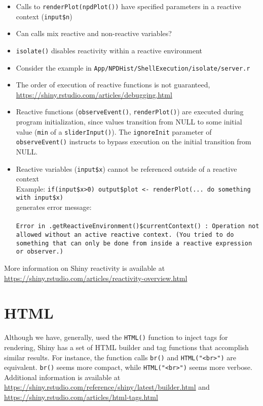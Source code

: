 \documentclass[10pt, letterpaper]{article}
\begin{document}
\begin{spacing}{1.0}
\begin{itemize}
    \item Calls to \texttt{renderPlot(npdPlot())} have specified parameters in a reactive context (\texttt{input\$n})
    \item Can calls mix reactive and non-reactive variables?
    \item \texttt{isolate()} disables reactivity within a reactive environment
    \item Consider the example in \texttt{App/NPDHist/ShellExecution/isolate/server.r}
    \item The order of execution of reactive functions is not guaranteed, \url{https://shiny.rstudio.com/articles/debugging.html}
    \item Reactive functions (\texttt{observeEvent()}, \texttt{renderPlot()}) are executed during program initialization, since values transition from NULL to some initial value (\texttt{min} of a \texttt{sliderInput()}).  The \texttt{ignoreInit} parameter of \texttt{observeEvent()} instructs to bypass execution on the initial transition from NULL.
    \item Reactive variables (\texttt{input\$x}) cannot be referenced outside of a reactive context\\
    Example: \texttt{if(input\$x>0) {output\$plot <- renderPlot(... do something with input\$x)}}\\
    generates error message:\\\\
    \texttt{Error in .getReactiveEnvironment()\$currentContext() : 
    Operation not allowed without an active reactive context. (You tried to do something that can only be done from inside a reactive expression or observer.)}
\end{itemize}

More information on Shiny reactivity is available at \url{https://shiny.rstudio.com/articles/reactivity-overview.html}


\section{HTML}\label{sec:HTML}

Although we have, generally, used the \texttt{HTML()} function to inject tags for rendering, Shiny has a set of HTML builder and tag functions that accomplish similar results.  For instance, the function calls \texttt{br()} and \texttt{HTML("<br>")} are equivalent.  \texttt{br()} seems more compact, while \texttt{HTML("<br>")} seems more verbose.  Additional information is available at \url{https://shiny.rstudio.com/reference/shiny/latest/builder.html} and \url{https://shiny.rstudio.com/articles/html-tags.html}


\end{spacing}
\end{document}
